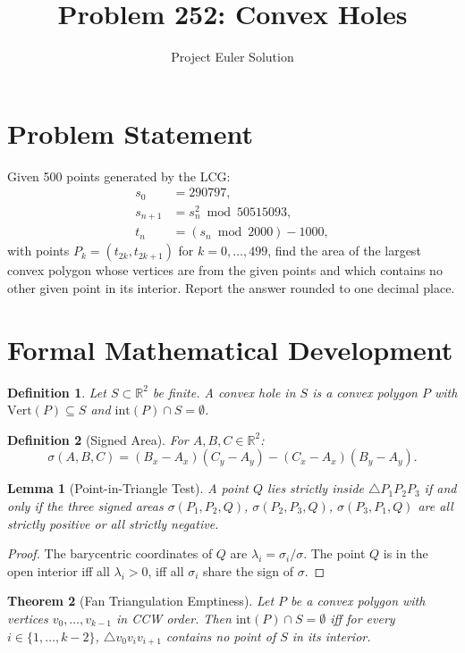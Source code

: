 \documentclass[12pt]{article}
\title{Problem 252: Convex Holes}
\author{Project Euler Solution}
\date{}
\newtheorem{theorem}{Theorem}
\newtheorem{lemma}[theorem]{Lemma}
\newtheorem{definition}{Definition}
\begin{document}
\maketitle

\section{Problem Statement}
Given 500 points generated by the LCG:
\begin{align}
s_0 &= 290797, \\
s_{n+1} &= s_n^2 \bmod 50515093, \\
t_n &= (s_n \bmod 2000) - 1000,
\end{align}
with points $P_k = (t_{2k}, t_{2k+1})$ for $k = 0, \ldots, 499$, find the area of the largest convex polygon whose vertices are from the given points and which contains no other given point in its interior. Report the answer rounded to one decimal place.

\section{Formal Mathematical Development}

\begin{definition}
Let $S \subset \mathbb{R}^2$ be finite. A \emph{convex hole} in $S$ is a convex polygon $P$ with $\mathrm{Vert}(P) \subseteq S$ and $\mathrm{int}(P) \cap S = \emptyset$.
\end{definition}

\begin{definition}[Signed Area]
For $A, B, C \in \mathbb{R}^2$:
\[
\sigma(A, B, C) = (B_x - A_x)(C_y - A_y) - (C_x - A_x)(B_y - A_y).
\]
\end{definition}

\begin{lemma}[Point-in-Triangle Test]
A point $Q$ lies strictly inside $\triangle P_1 P_2 P_3$ if and only if the three signed areas $\sigma(P_1, P_2, Q)$, $\sigma(P_2, P_3, Q)$, $\sigma(P_3, P_1, Q)$ are all strictly positive or all strictly negative.
\end{lemma}

\begin{proof}
The barycentric coordinates of $Q$ are $\lambda_i = \sigma_i / \sigma$. The point $Q$ is in the open interior iff all $\lambda_i > 0$, iff all $\sigma_i$ share the sign of $\sigma$.
\end{proof}

\begin{theorem}[Fan Triangulation Emptiness]
Let $P$ be a convex polygon with vertices $v_0, \ldots, v_{k-1}$ in CCW order. Then $\mathrm{int}(P) \cap S = \emptyset$ iff for every $i \in \{1, \ldots, k-2\}$, $\triangle v_0 v_i v_{i+1}$ contains no point of $S$ in its interior.
\end{theorem}
\end{document}
